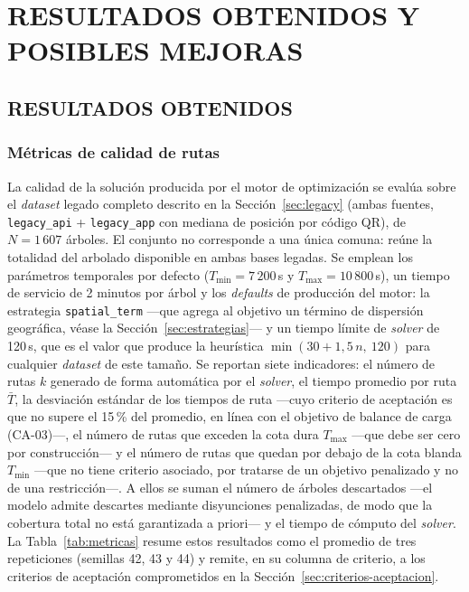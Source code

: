\chapter{RESULTADOS OBTENIDOS Y POSIBLES MEJORAS}
\label{cap:resultados}

\section{RESULTADOS OBTENIDOS}
\subsection{Métricas de calidad de rutas}
\label{sec:metricas-calidad}

La calidad de la solución producida por el motor de optimización se evalúa sobre el
\textit{dataset} legado completo descrito en la Sección~\ref{sec:legacy} (ambas
fuentes, \texttt{legacy\_api} + \texttt{legacy\_app} con mediana de posición por
código QR), de $N = 1\,607$ árboles. El conjunto no corresponde a una única
comuna: reúne la totalidad del arbolado disponible en ambas bases legadas. Se
emplean los parámetros temporales por defecto ($T_{\min} = 7\,200$\,s y
$T_{\max} = 10\,800$\,s), un tiempo de servicio de 2 minutos por árbol y los
\textit{defaults} de producción del motor: la estrategia \texttt{spatial\_term}
---que agrega al objetivo un término de dispersión geográfica, véase la
Sección~\ref{sec:estrategias}--- y un tiempo límite de \textit{solver} de 120\,s, que es
el valor que produce la heurística $\min(30 + 1{,}5\,n,\ 120)$ para cualquier
\textit{dataset} de este tamaño. Se reportan siete indicadores: el número de
rutas $k$ generado de forma automática por el \textit{solver}, el tiempo promedio por
ruta $\bar{T}$, la desviación estándar de los tiempos de ruta ---cuyo criterio
de aceptación es que no supere el 15\,\% del promedio, en línea con el objetivo
de balance de carga (CA-03)---, el número de rutas que exceden la cota dura
$T_{\max}$ ---que debe ser cero por construcción--- y el número de rutas que
quedan por debajo de la cota blanda $T_{\min}$ ---que no tiene criterio asociado,
por tratarse de un objetivo penalizado y no de una restricción---. A ellos se suman
el número de árboles descartados ---el modelo admite descartes mediante disyunciones
penalizadas, de modo que la cobertura total no está garantizada a priori--- y el
tiempo de cómputo del \textit{solver}. La Tabla~\ref{tab:metricas} resume estos
resultados como el promedio de tres repeticiones (semillas 42, 43 y 44) y remite,
en su columna de criterio, a los criterios de aceptación comprometidos en la
Sección~\ref{sec:criterios-aceptacion}.

